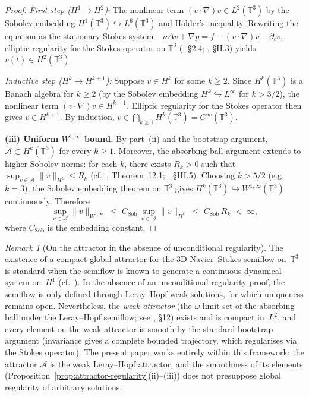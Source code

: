 \documentclass[12pt,a4paper]{article}
\theoremstyle{definition}
\theoremstyle{plain}
\theoremstyle{remark}
\newtheorem{remark}[definition]{Remark}
\begin{document}
\begin{proof}
\emph{First step ($H^1 \to H^2$):} The nonlinear term
$(v\cdot\nabla)v \in L^2(\mathbb{T}^3)$ by the Sobolev embedding
$H^1(\mathbb{T}^3) \hookrightarrow L^6(\mathbb{T}^3)$ and H\"older's
inequality.  Rewriting the equation as the stationary Stokes system
$-\nu\Delta v + \nabla p = f - (v\cdot\nabla)v - \partial_t v$,
elliptic regularity for the Stokes operator on $\mathbb{T}^3$
(\cite{ConstantinFoias1988}, \S2.4; \cite{Temam2001}, \S II.3) yields
$v(t) \in H^2(\mathbb{T}^3)$.

\emph{Inductive step ($H^k \to H^{k+1}$):}  Suppose $v \in H^k$ for some
$k \ge 2$.  Since $H^k(\mathbb{T}^3)$ is a Banach algebra for $k \ge 2$
(by the Sobolev embedding $H^k \hookrightarrow L^\infty$ for $k > 3/2$),
the nonlinear term $(v\cdot\nabla)v \in H^{k-1}$.  Elliptic regularity for
the Stokes operator then gives $v \in H^{k+1}$.  By induction,
$v \in \bigcap_{k\ge 1} H^k(\mathbb{T}^3) = C^\infty(\mathbb{T}^3)$.

\medskip
\noindent\textbf{(iii) Uniform $W^{1,\infty}$ bound.}
By part~(ii) and the bootstrap argument, $\mathcal{A} \subset H^k(\mathbb{T}^3)$
for every $k \ge 1$.  Moreover, the absorbing ball argument extends to higher
Sobolev norms: for each $k$, there exists $R_k > 0$ such that
$\sup_{v\in\mathcal{A}}\|v\|_{H^k} \le R_k$ (cf.\ \cite{FoiasManleyRosaTemam2001},
Theorem~12.1; \cite{Temam2001}, \S III.5).
Choosing $k > 5/2$ (e.g.\ $k = 3$), the Sobolev embedding theorem on
$\mathbb{T}^3$ gives $H^k(\mathbb{T}^3) \hookrightarrow W^{1,\infty}(\mathbb{T}^3)$
continuously.  Therefore
\[
    \sup_{v\in\mathcal{A}} \|v\|_{W^{1,\infty}}
    \;\le\; C_{\mathrm{Sob}}\,\sup_{v\in\mathcal{A}} \|v\|_{H^k}
    \;\le\; C_{\mathrm{Sob}}\,R_k
    \;<\; \infty,
\]
where $C_{\mathrm{Sob}}$ is the embedding constant.
\end{proof}

\begin{remark}[On the attractor in the absence of unconditional regularity]
\label{rem:circularity}
The existence of a compact global attractor for the 3D Navier--Stokes
semiflow on~$\mathbb{T}^3$ is standard when the semiflow is known to
generate a continuous dynamical system on~$H^1$
(cf.~\cite{Temam2001,FoiasManleyRosaTemam2001}).  In the absence of
an unconditional regularity proof, the semiflow is only defined through
Leray--Hopf weak solutions, for which uniqueness remains open.
Nevertheless, the \emph{weak attractor} (the $\omega$-limit set of the
absorbing ball under the Leray--Hopf semiflow; see
\cite{FoiasManleyRosaTemam2001}, \S12) exists and is compact
in~$L^2$, and every element on the weak attractor is smooth by the
standard bootstrap argument (invariance gives a complete bounded
trajectory, which regularises via the Stokes operator).  The present
paper works entirely within this framework: the attractor
$\mathcal{A}$ is the weak Leray--Hopf attractor, and the smoothness
of its elements (Proposition~\ref{prop:attractor-regularity}(ii)--(iii))
does not presuppose global regularity of arbitrary solutions.
\end{remark}
\end{document}
